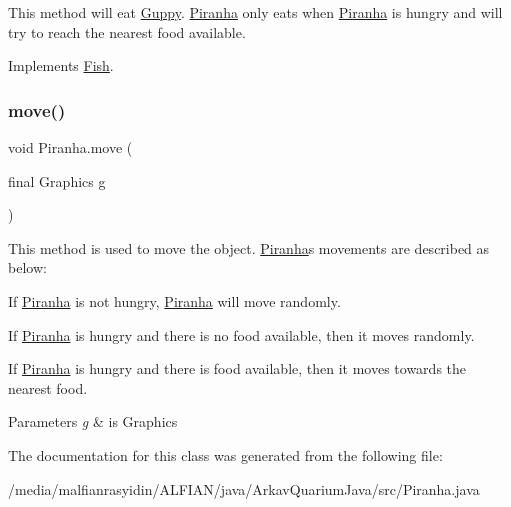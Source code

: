 This method will eat \mbox{\hyperlink{class_guppy}{Guppy}}. \mbox{\hyperlink{class_piranha}{Piranha}} only eats when \mbox{\hyperlink{class_piranha}{Piranha}} is hungry and will try to reach the nearest food available. 

Implements \mbox{\hyperlink{interface_fish_a72d533bdc4ac39f4ffd93d70504efed8}{Fish}}.

\mbox{\label{class_piranha_a65ebc6270eb3b1eeaad1c9c0eb53d399}} 
\subsubsection{\texorpdfstring{move()}{move()}}
{\footnotesize\ttfamily void Piranha.\+move (\begin{DoxyParamCaption}\item[{final Graphics}]{g }\end{DoxyParamCaption})\hspace{0.3cm}{\ttfamily [inline]}}

This method is used to move the object. \mbox{\hyperlink{class_piranha}{Piranha}}\textquotesingle{}s movements are described as below\+:
\begin{DoxyEnumerate}
\item If \mbox{\hyperlink{class_piranha}{Piranha}} is not hungry, \mbox{\hyperlink{class_piranha}{Piranha}} will move randomly.
\item If \mbox{\hyperlink{class_piranha}{Piranha}} is hungry and there is no food available, then it moves randomly.
\item If \mbox{\hyperlink{class_piranha}{Piranha}} is hungry and there is food available, then it moves towards the nearest food.
\end{DoxyEnumerate}


\begin{DoxyParams}{Parameters}
{\em g} & is Graphics \\
\hline
\end{DoxyParams}


The documentation for this class was generated from the following file\+:\begin{DoxyCompactItemize}
\item 
/media/malfianrasyidin/\+A\+L\+F\+I\+A\+N/java/\+Arkav\+Quarium\+Java/src/Piranha.\+java\end{DoxyCompactItemize}
